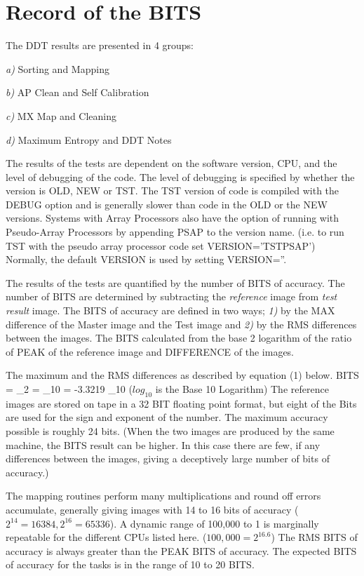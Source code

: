 \section{Record of the BITS}
The DDT results are presented in 4 groups:
\begin{description}
\item {\it a)} Sorting and Mapping
\item {\it b)} AP Clean and Self Calibration
\item {\it c)} MX Map and Cleaning
\item {\it d)} Maximum Entropy and DDT Notes
\end{description}
The results of the tests are dependent on the
software version, CPU, and the level of debugging
of the code.
The level of debugging is specified by whether
the version is OLD, NEW or TST.
The TST version of code is compiled with
the DEBUG option and is generally slower than
code in the OLD or the NEW versions.
Systems with Array Processors also have the option of
running with Pseudo-Array Processors by appending PSAP
to the version name. (i.e. to run TST with the pseudo array
processor code set VERSION='TSTPSAP')
Normally, the default VERSION is used by setting VERSION=''.

The results of the tests are quantified by the number of BITS
of accuracy.
The number of BITS are determined by subtracting the
{\it reference} image from {\it test result} image.
The BITS of accuracy are defined
in two ways; {\it 1)}
by the MAX difference of the Master image and the
Test image and
{\it 2)} by the RMS differences between the images.
The BITS calculated from the base 2 logarithm of the ratio
of PEAK of the reference image and DIFFERENCE of the images.

The maximum and the RMS differences as described by equation (1) below.
\beq
BITS = \log_2{} =
       \log_{10}{} =
       -3.3219 \times \log_{10}{}
\eeq
($log_{10}$ is the Base 10 Logarithm)
The reference images are stored on tape in a 32 BIT floating point
format, but eight of the Bits are used for the sign and
exponent of the number.
The maximum accuracy possible is roughly 24 bits.
(When the two images are produced by the same machine, the
BITS result can be higher.
In this case there are few, if any
differences between the images, giving a deceptively
large number of bits of accuracy.)

The mapping routines perform many multiplications
and round off errors accumulate, generally giving
images with 14 to 16 bits of accuracy
($2^{14} = 16384, 2^{16} = 65336$).
A dynamic range of 100,000 to 1 is marginally repeatable
for the different CPUs listed here.  ($100,000 = 2^{16.6}$)
The RMS BITS of accuracy is
always greater than the PEAK BITS of accuracy.
The expected BITS of accuracy for the tasks is in the
range of 10 to 20 BITS.

